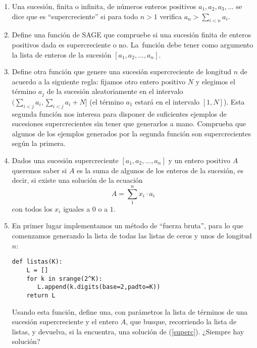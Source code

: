 \begin{enumerate}

\item Una sucesi\'on, finita o infinita, de n\'umeros enteros positivos
$a_1,a_2,a_3,\dots$ se dice que es ``supercreciente'' si para todo $n>1$ 
verifica
$a_n>\sum\limits_{i<n}a_i.$

\item  Define una funci\'on de SAGE que compruebe si una sucesi\'on finita de
enteros positivos dada es supercreciente o no. La~funci\'on debe tener como
argumento la lista de enteros de la sucesi\'on $[a_1,a_2,\dots,a_n]$.
\item Define  otra funci\'on que genere una sucesi\'on supercreciente de
longitud $n$  de acuerdo a la siguiente regla: fijamos otro entero positivo  $N$
y elegimos el t\'ermino $a_j$ de la sucesi\'on aleatoriamente en el intervalo
$(\sum_{i<j}a_i,\sum_{i<j}a_i+N]$ (el t\'ermino $a_1$ estar\'a en el
intervalo $[1,N]$). Esta segunda funci\'on nos interesa para disponer de
suficientes ejemplos de sucesiones supercrecientes sin tener que generarlos a
mano. Comprueba que algunos de los ejemplos generados por la segunda funci\'on
son supercrecientes seg\'un la primera.
\item Dados una sucesi\'on supercreciente $[a_1,a_2,\dots,a_n]$ y un entero
positivo $A$ queremos saber si $A$ es la suma de algunos de los enteros de la
sucesi\'on, es decir, si existe una solución de la ecuaci\'on 
\begin{equation}\label{superc}
A=\sum_1^n
x_i\cdot a_i
\end{equation}
\noindent con todos los $x_i$ iguales a $0$ o a $1$. 
\item En primer lugar
implementamos un m\'etodo de ``fuerza bruta'', para lo que comenzamos generando 
la
lista de todas las listas de ceros y unos de longitud $n$:
\begin{lstlisting}
def listas(K):
    L = []
    for k in srange(2^K):
       L.append(k.digits(base=2,padto=K))
    return L 
\end{lstlisting}

Usando esta funci\'on, define una, con par\'ametros la lista de t\'erminos de
una sucesi\'on supercreciente y el entero $A$,  que busque, recorriendo la lista
de listas,  y devuelva, si la encuentra, una soluci\'on de (\ref{superc}).
¿Siempre hay soluci\'on?


\end{enumerate}
